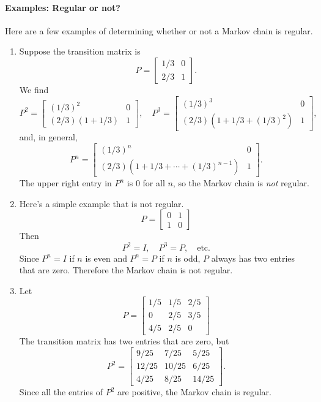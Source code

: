 \documentclass{book}
\begin{document}
\paragraph{Examples: Regular or not?}
Here are a few examples of determining whether or not a
Markov chain is regular.
\begin{enumerate}
\item Suppose the transition matrix is
\begin{equation}
  P = \begin{bmatrix} 1/3 & 0 \\ 2/3 & 1 \end{bmatrix}.
\end{equation}
We find
\begin{equation}
 P^2 = \begin{bmatrix} (1/3)^2 & 0 \\ (2/3)(1+1/3) & 1 \end{bmatrix},
 \quad
 P^3 = \begin{bmatrix} (1/3)^3 & 0 \\ (2/3)(1+1/3+(1/3)^2) & 1 \end{bmatrix},
\end{equation}
and, in general,
\begin{equation}
 P^n = \begin{bmatrix} (1/3)^n & 0 \\ (2/3)(1+1/3+\cdots+(1/3)^{n-1}) & 1 \end{bmatrix}.
\end{equation}
The upper right entry in $P^n$ is $0$ for all $n$, so the Markov chain
is \emph{not} regular.
\item Here's a simple example that is not regular.
\begin{equation}
   P = \begin{bmatrix} 0 & 1 \\ 1 & 0 \end{bmatrix}
\end{equation}
Then
\begin{equation}
   P^2 = I, \quad P^3 = P, \quad \textrm{etc.}
\end{equation}
Since $P^n=I$ if $n$ is even and $P^n=P$ if $n$ is odd, $P$
always has two entries that are zero.  Therefore the Markov
chain is not regular.
\item
Let
\begin{equation}
  P = \begin{bmatrix}
           1/5 & 1/5 & 2/5 \\
	   0   & 2/5 & 3/5 \\
	   4/5 & 2/5 & 0
      \end{bmatrix}
\end{equation}
The transition matrix has two entries that are zero, but
\begin{equation}
  P^2 = \begin{bmatrix}
           9/25 & 7/25 & 5/25 \\
	   12/25 & 10/25 & 6/25 \\
	   4/25 & 8/25 & 14/25
        \end{bmatrix}.
\end{equation}
Since all the entries of $P^2$ are positive, the Markov chain
is regular.
\end{enumerate}
%
%
%
\end{document}
